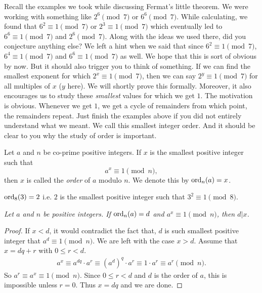 \documentclass{subfile}
\begin{document}
Recall the examples we took while discussing Fermat's little theorem. We were working with something like $2^6\pmod7$ or $6^6\pmod7$. While calculating, we found that $6^2\equiv1\pmod7$ or $2^3\equiv1\pmod7$ which eventually led to $6^6\equiv1\pmod7$ and $2^6\pmod7$. Along with the ideas we used there, did you conjecture anything else? We left a hint when we said that since $6^2\equiv1\pmod7$, $6^4\equiv1\pmod7$ and $6^6\equiv1\pmod7$ as well. We hope that this is sort of obvious by now. But it should also trigger you to think of something. If we can find the smallest exponent for which $2^x\equiv1\pmod7$, then we can say $2^y\equiv1\pmod7$ for all multiples of $x$ ($y$ here). We will shortly prove this formally. Moreover, it also encourages us to study these \textit{smallest }values for which we get $1$. The motivation is obvious. Whenever we get $1$, we get a cycle of remainders from which point, the remainders repeat. Just finish the examples above if you did not entirely understand what we meant. We call this smallest integer order. And it should be clear to you why the study of order is important.
	\begin{definition}
		Let $a$ and $n$ be co-prime positive integers. If $x$ is the smallest positive integer such that  \[a^x\equiv1\pmod n,\] then $x$ is called the \textit{order} of $a$ modulo $n$. We denote this by $\operatorname{ord}_n(a)=x$.
	\end{definition}
	
	\begin{example}
		$\operatorname{ord}_8(3)=2$ i.e. $2$ is the smallest positive integer such that  $3^2\equiv1\pmod 8$.
	\end{example}
	

	\begin{theorem}\slshape\label{thm:ordDiv}
		Let $a$ and $n$ be positive integers. If $\operatorname{ord}_n(a)=d$ and $a^x\equiv1\pmod n$, then $d|x$.
	\end{theorem}
	
	\begin{proof}
		If $x<d$, it would contradict the fact that, $d$ is such smallest positive integer that $a^d\equiv1\pmod n$. We are left with the case $x>d$. Assume that $x=dq+r$ with $0\leq r<d$.
			\begin{align*}
				a^x  \equiv a^{dq}\cdot a^r  \equiv (a^d)^q \cdot a^r  \equiv 1 \cdot a^r  \equiv a^r \pmod n.
			\end{align*}
		So $a^r \equiv a^x \equiv 1 \pmod n$. Since $0\leq r<d$ and $d$ is the order of $a$, this is impossible unless $r=0$. Thus $x=dq$ and we are done.
	\end{proof}
	
\end{document}
